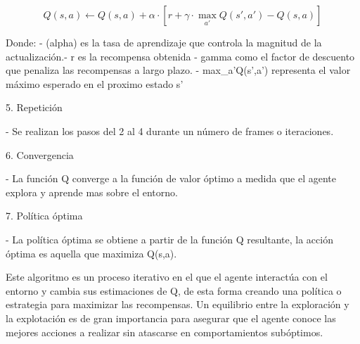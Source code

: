 		\begin{equation}
		Q(s, a) \leftarrow Q(s, a) + \alpha \cdot \left[ r + \gamma \cdot \max_{a'} 		Q(s', a') - Q(s, a) \right]
		\end{equation}

		Donde:\newline
			- (alpha) es la tasa de aprendizaje que controla la magnitud de la actualización.\newline			- r es la recompensa obtenida
			- gamma como el factor de descuento que penaliza las recompensas a largo plazo.\newline
			- max_a'Q(s',a') representa el valor máximo esperado en el proximo estado s'\newline


5. Repetición

	- Se realizan los pasos del 2 al 4 durante un número de frames o iteraciones.


6. Convergencia
	
	- La función Q converge a la función de valor óptimo a medida que el agente explora 	y aprende mas sobre el entorno.


7. Política óptima

	- La política óptima se obtiene a partir de la función Q resultante, la acción 	óptima es aquella que maximiza Q(s,a).


Este algoritmo es un proceso iterativo en el que el agente interactúa con el entorno y cambia sus estimaciones de Q, de esta forma creando una política o estrategia para maximizar las recompensas. Un equilibrio entre la exploración y la explotación es de gran importancia para asegurar que el agente conoce las mejores acciones a realizar sin atascarse en comportamientos subóptimos.